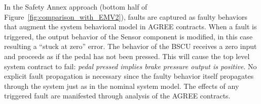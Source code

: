 In the Safety Annex approach (bottom half of Figure~\ref{fig:comparison_with_EMV2}), faults are captured as faulty behaviors that augment the system behavioral model in AGREE contracts.  When a fault is triggered, the output behavior of the Sensor component is modified, in this case resulting a ``stuck at zero'' error. The behavior of the BSCU receives a zero input and proceeds as if the pedal has not been pressed. This will cause the top level system contract to fail: {\em pedal pressed implies brake pressure output is positive}. No explicit fault propagation is necessary since the faulty behavior itself propagates through the system just as in the nominal system model. The effects of any triggered fault are manifested through analysis of the AGREE contracts. 


 \fi



